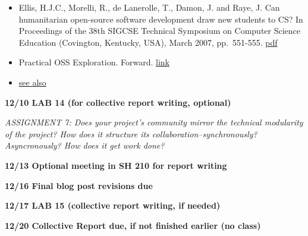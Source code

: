 \begin{itemize}
\itemsep1pt\parskip0pt
\item
  Ellis, H.J.C., Morelli, R., de Lanerolle, T., Damon, J. and Raye, J.
  Can humanitarian open-source software development draw new students to
  CS? In Proceedings of the 38th SIGCSE Technical Symposium on Computer
  Science Education (Covington, Kentucky, USA), March 2007, pp.~551-555.
  \href{http://www.cs.trincoll.edu/hfoss/images/0/0a/Ellis_etal_SIGCSE_2007.pdf}{pdf}
\item
  Practical OSS Exploration. Forward.
  \href{http://teachingopensource.org/index.php?title=Practical_OSS_Exploration_-_Foreword\&direction=next\&oldid=3605}{link}
\item
  \href{http://www.hfoss.org/index.php/publications-etc}{see also}
\end{itemize}

\textbf{12/10 LAB 14 (for collective report writing, optional)}

\emph{ASSIGNMENT 7: Does your project's community mirror the technical
modularity of the project? How does it structure its
collaboration--synchronously? Asyncronously? How does it get work done?}

\textbf{12/13 Optional meeting in SH 210 for report writing}

\textbf{12/16 Final blog post revisions due }

\textbf{12/17 LAB 15 (collective report writing, if needed)}

\textbf{12/20 Collective Report due, if not finished earlier (no class)}
